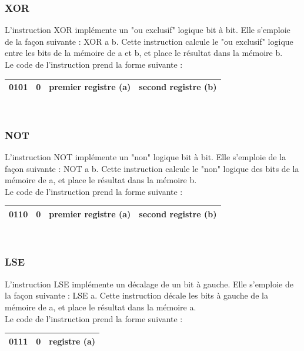 \documentclass[a4paper, 12pt, twoside]{report}
\begin{document}
\subsubsection{XOR}

L'instruction XOR implémente un "ou exclusif" logique bit à bit. Elle s'emploie de la façon suivante :
XOR a b. Cette instruction calcule le "ou exclusif" logique entre les bits de la mémoire de a et b, 
et place le résultat dans la mémoire b.\\

Le code de l'instruction prend la forme suivante :

\begin{tabular}{|c|c|c|c|}
  \hline
  0101 & 0 & premier registre (a) & second registre (b) \\
  \hline
\end{tabular}\\

\subsubsection{NOT}

L'instruction NOT implémente un "non" logique bit à bit. Elle s'emploie de la façon suivante :
NOT a b. Cette instruction calcule le "non" logique des bits de la mémoire de a,
et place le résultat dans la mémoire b.\\

Le code de l'instruction prend la forme suivante :

\begin{tabular}{|c|c|c|c|}
  \hline
  0110 & 0 & premier registre (a) & second registre (b) \\
  \hline
\end{tabular}\\

\subsubsection{LSE}

L'instruction LSE implémente un décalage de un bit à gauche. Elle s'emploie de la façon suivante :
LSE a. Cette instruction décale les bits à gauche de la mémoire de a, et place le résultat dans la mémoire a.\\

Le code de l'instruction prend la forme suivante :

\begin{tabular}{|c|c|c|}
  \hline
  0111 & 0 & registre (a) \\
  \hline
\end{tabular}\\
\end{document}
